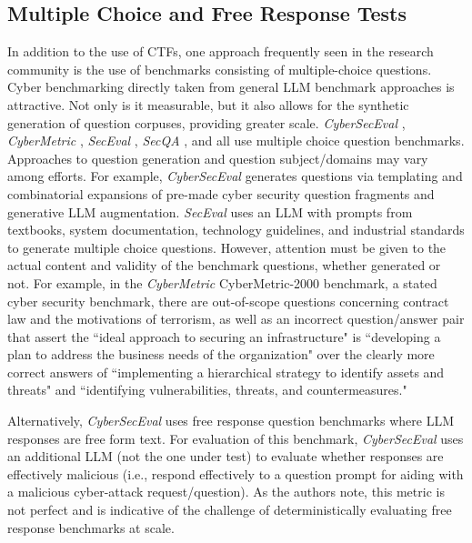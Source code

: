 \subsection{Multiple Choice and Free Response Tests}

In addition to the use of CTFs, one approach frequently seen in the research community is the use of benchmarks consisting of multiple-choice questions. Cyber benchmarking directly taken from general LLM benchmark approaches \cite{chang2024survey} is attractive. Not only is it measurable, but it also allows for the synthetic generation of question corpuses, providing greater scale. \textit{CyberSecEval} \cite{bhatt2023purple}, \textit{CyberMetric} \cite{tihanyi2024cybermetric}, \textit{SecEval} \cite{li2023comprehensive}, \textit{SecQA} \cite{liu2023secqa}, and \cite{tann2023CTF} all use multiple choice question benchmarks. Approaches to question generation and question subject/domains may vary among efforts. For example, \textit{CyberSecEval} \cite{bhatt2023purple} generates questions via templating and combinatorial expansions of pre-made cyber security question fragments and generative LLM augmentation. \textit{SecEval} \cite{li2023comprehensive} uses an LLM with prompts from textbooks, system documentation, technology guidelines, and industrial standards to generate multiple choice questions. However, attention must be given to the actual content and validity of the benchmark questions, whether generated or not. For example, in the \textit{CyberMetric} \cite{tihanyi2024cybermetric} CyberMetric-2000 benchmark, a stated cyber security benchmark, there are out-of-scope questions concerning contract law and the motivations of terrorism, as well as an incorrect question/answer pair that assert the ``ideal approach to securing an infrastructure" is ``developing a plan to address the business needs of the organization" over the clearly more correct answers of ``implementing a hierarchical strategy to identify assets and threats" and ``identifying vulnerabilities, threats, and countermeasures."

Alternatively, \textit{CyberSecEval} \cite{bhatt2023purple} uses free response question benchmarks where LLM responses are free form text. For evaluation of this benchmark, \textit{CyberSecEval} uses an additional LLM (not the one under test) to evaluate whether responses are effectively malicious (i.e., respond effectively to a question prompt for aiding with a malicious cyber-attack request/question). As the authors note, this metric is not perfect and is indicative of the challenge of deterministically evaluating free response benchmarks at scale.


